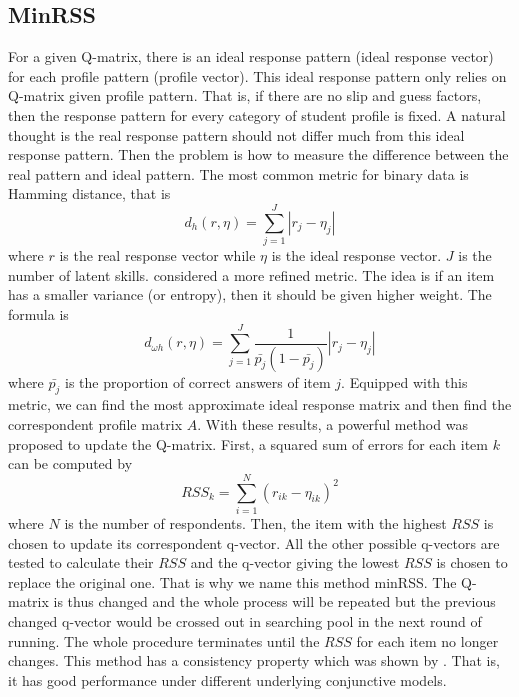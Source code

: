 \documentclass[12pt]{article}
\begin{document}
\subsection{MinRSS}
For a given Q-matrix, there is an ideal response pattern (ideal response vector) for each profile pattern (profile vector). This ideal response pattern only relies on Q-matrix given profile pattern. That is, if there are no slip and guess factors, then the response pattern for every category of student profile is fixed. A natural thought is the real response pattern should not differ much from this ideal response pattern. Then the problem is how to measure the difference between the real pattern and ideal pattern. The most common metric for binary data is Hamming distance, that is
$$ d_h(r,\eta)=\sum_{j=1}^{J}|r_j-\eta_j|$$
where $r$ is the real response vector while $\eta$ is the ideal response vector. $J$ is the number of latent skills. \cite{chiu2013nonparametric} considered a more refined metric. The idea is if an item has a smaller variance (or entropy), then it should be given higher weight. The formula is
$$ d_{\omega h}(r,\eta)=\sum_{j=1}^{J}\frac{1}{\bar{p_j}(1-\bar{p_j})}|r_j-\eta_j|$$
where $\bar{p_j}$ is the proportion of correct answers of item $j$. Equipped with this metric, we can find the most approximate ideal response matrix and then find the correspondent profile matrix $A$. With these results, a powerful method was proposed to update the Q-matrix\cite{chiu2013statistical}. First, a squared sum of errors for each item $k$ can be computed by
$$ RSS_k=\sum_{i=1}^{N}(r_{ik}-\eta_{ik})^2$$
where $N$ is the number of respondents. Then, the item with the highest $RSS$ is chosen to update its correspondent q-vector. All the other possible q-vectors are tested to calculate their $RSS$ and the q-vector giving the lowest $RSS$ is chosen to replace the original one. That is why we name this method minRSS. The Q-matrix is thus changed and the whole process will be repeated but the previous changed q-vector would be crossed out in searching pool in the next round of running. The whole procedure terminates until the $RSS$ for each item no longer changes.
This method has a consistency property which was shown by \cite{wang2015consistency}. That is, it has good performance under different underlying conjunctive models.
\end{document}
